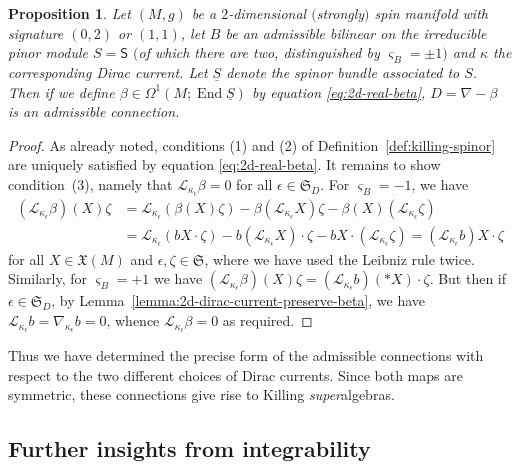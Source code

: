 \documentclass[10pt,a4paper]{amsart}
\numberwithin{equation}{section}
\newtheorem{Proposition}[Theorem]{Proposition}
 { \theoremstyle{definition}
\newtheorem{Definition}[Theorem]{Definition}
\newtheorem{Note}[Theorem]{Note}
\newtheorem{Example}[Theorem]{Example}
\newtheorem{Remark}[Theorem]{Remark} }
\newcommand{\fX}{\mathfrak{X}}
\newcommand{\fS}{\mathfrak{S}}
\newcommand{\eL}{\mathscr{L}}
\newcommand{\ssS}{\mathsf{S}}
\newcommand{\Sbundle}{\underline{S}}
\newcommand{\1}{\mathbbm{1}}
\DeclareMathOperator{\End}{End}
\begin{document}
\begin{Proposition}\label{prop:2d-real-KSA-exist}
	Let $(M,g)$ be a $2$-dimensional $($strongly$)$ spin manifold with signature $(0,2)$ or $(1,1)$, let $B$ be an admissible bilinear on the irreducible pinor module $S=\ssS$ $($of which there are two, distinguished by $\varsigma_B=\pm 1$$)$ and $\kappa$ the corresponding Dirac current. Let $\Sbundle$ denote the spinor bundle associated to $S$. Then if we define $\beta\in\Omega^1(M;\End\Sbundle)$ by equation \eqref{eq:2d-real-beta}, $D=\nabla-\beta$ is an admissible connection.
\end{Proposition}

\begin{proof}
	As already noted, conditions (1) and (2) of Definition~\ref{def:killing-spinor} are uniquely satisfied by equation \eqref{eq:2d-real-beta}. It remains to show condition~(3), namely that $\eL_{\kappa_\epsilon}\beta=0$ for all $\epsilon\in\fS_D$. For $\varsigma_B=-1$, we have
	\begin{align*}
		(\eL_{\kappa_\epsilon}\beta)(X)\zeta
			&= \eL_{\kappa_\epsilon}(\beta(X)\zeta) - \beta(\eL_{\kappa_\epsilon}X)\zeta - \beta(X)(\eL_{\kappa_\epsilon}\zeta)	\\
			&= \eL_{\kappa_\epsilon}(bX\cdot\zeta) - b(\eL_{\kappa_\epsilon}X)\cdot\zeta - bX\cdot (\eL_{\kappa_\epsilon}\zeta)	= (\eL_{\kappa_\epsilon}b)X\cdot\zeta	
	\end{align*}
	for all $X\in\fX(M)$ and $\epsilon,\zeta\in\fS$, where we have used the Leibniz rule twice. Similarly, for $\varsigma_B=+1$ we have $(\eL_{\kappa_\epsilon}\beta)(X)\zeta= (\eL_{\kappa_\epsilon}b)(*X)\cdot\zeta$. But then if $\epsilon\in\fS_D$, by Lemma~\ref{lemma:2d-dirac-current-preserve-beta}, we have $\eL_{\kappa_\epsilon}b=\nabla_{\kappa_\epsilon}b=0$, whence $\eL_{\kappa_\epsilon}\beta=0$ as required.
\end{proof}


Thus we have determined the precise form of the admissible connections with respect to the two different choices of Dirac currents. Since both maps are symmetric, these connections give rise to Killing \emph{super}algebras.

\subsection{Further insights from integrability}
\end{document}
